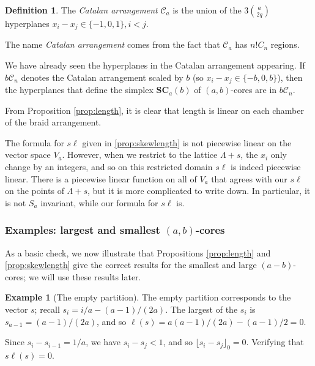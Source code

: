 \documentclass{amsart}[12pt]
\theoremstyle{definition}
\newtheorem{example}[dummy]{Example}
\newtheorem{definition}[dummy]{Definition}
\newcommand{\SC}{\mathbf{SC}}
\newcommand{\sk}{s\ell}
\begin{document}
\begin{definition} \label{def:arrangements}
The \emph{Catalan arrangement} $\mathcal{C}_a$ is the union of the $3\binom{a}{2q}$ hyperplanes $x_i-x_j\in\{-1,0,1\}, i<j$.
\end{definition}

The name \emph{Catalan arrangement} comes from the fact that $\mathcal{C}_a$ has $n!C_n$ regions.

We have already seen the hyperplanes in the Catalan arrangement appearing.  If $b\mathcal{C}_n$ denotes the Catalan arrangement scaled by $b$ (so $x_i-x_j\in\{-b,0,b\}$), then the hyperplanes that define the simplex $\SC_a(b)$ of $(a,b)$-cores are in $b\mathcal{C}_n$.

From Proposition \ref{prop:length}, it is clear that length is linear on each chamber of the braid arrangement.  

The formula for $\sk$ given in \ref{prop:skewlength} is not piecewise linear on the vector space $V_a$.  However, when we restrict to the lattice $\Lambda+s$, the $x_i$ only change by an integers, and so on this restricted domain $\sk$ is indeed piecewise linear.  There is a piecewise linear function on all of $V_a$ that agrees with our $\sk$ on the points of $\Lambda+s$, but it is more complicated to write down.  In particular, it is not $S_a$ invariant, while our formula for $\sk$ is.


\subsubsection{Examples: largest and smallest $(a,b)$-cores}
As a basic check, we now illustrate that Propositions \ref{prop:length} and \ref{prop:skewlength} give the correct results for the smallest and large $(a-b)$-cores; we will use these results later.

\begin{example}[The empty partition]
The empty partition corresponds to the vector $s$; recall $s_i=i/a-(a-1)/(2a)$.  
  The largest of the $s_i$ is $s_{a-1}=(a-1)/(2a)$, and so $\ell(s)=a(a-1)/(2a)-(a-1)/2=0$.  

Since $s_i-s_{i-1}=1/a$, we have $s_i-s_j<1$, and so $\lfloor s_i-s_j\rfloor_0=0$.  Verifying that $\sk(s)=0$.




\end{example}
\end{document}
